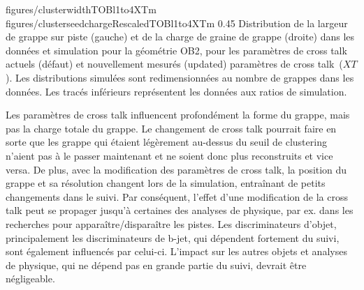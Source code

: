                  {figures/clusterwidthTOBl1to4XTm}
                 {figures/clusterseedchargeRescaledTOBl1to4XTm} %
                 {0.45}       %
                 {Distribution de la largeur de grappe sur piste (gauche) et de la charge  de graine de  grappe (droite) dans les données et simulation pour la géométrie OB2, pour les paramètres de cross talk actuels (défaut) et nouvellement mesurés (updated) paramètres de cross talk~($XT$). Les distributions simulées sont redimensionnées au nombre de grappes dans les données. Les tracés inférieurs représentent les données aux ratios de simulation. }



Les paramètres de cross talk influencent profondément la forme du grappe, mais pas la charge totale du grappe. Le changement de cross talk pourrait faire en sorte que les grappe qui étaient légèrement au-dessus du seuil de clustering n’aient pas à le passer maintenant et ne soient donc plus reconstruits et vice versa. De plus, avec la modification des paramètres de cross talk, la position du grappe et sa résolution changent lors de la simulation, entraînant de petits changements dans le suivi. Par conséquent, l'effet d'une modification de la cross talk peut se propager jusqu'à certaines des analyses de physique, par ex. dans les recherches pour apparaître/disparaître les pistes. Les discriminateurs d'objet, principalement les discriminateurs de b-jet, qui dépendent fortement du suivi, sont également influencés par celui-ci. L'impact sur les autres objets et analyses de physique, qui ne dépend pas en grande partie du suivi, devrait être négligeable.

